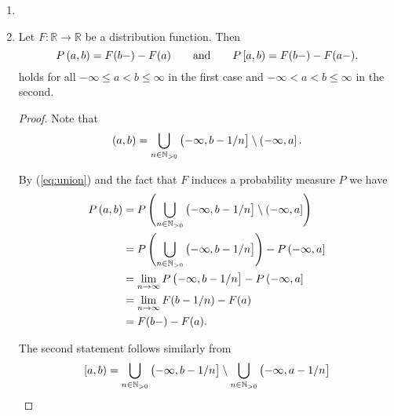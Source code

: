 \begin{enumerate}[label = \textbf{Exercise \arabic*.},wide = 0pt, itemsep=1.5ex]
\begin{proof}
		Furthermore
		\begin{equation}
			Q(A) \geq \sum_{n \in \mathbb{N}}P(A_n \cap B) + \sum_{n \in \mathbb{N}} P(A_n \cap B^c) - \varepsilon \geq Q(A \cap B) + Q(A \cap B^c) - \varepsilon
		\end{equation}

		\noindent by the additivity of $P$.

	\end{proof}
	\item 

	\item 
		\begin{lemma}
			Let $F: \mathbb{R} \to \mathbb{R}$ be a distribution function. Then
			\begin{equation}
				P\intoo{a,b} = F(b-) - F(a) \qquad \text{and} \qquad P\intco{a,b} = F(b- ) - F(a-).
			\end{equation}
			\noindent holds for all $-\infty \leq a < b \leq \infty$ in the first case and $-\infty < a < b \leq \infty$ in the second.
			\label{lem:3}
		\end{lemma}

		\begin{proof}
			Note that 
			\begin{equation}
				\intoo{a,b} = \bigcup_{n \in \mathbb{N}_{>0}} \intoc{-\infty,b - 1/n} \setminus \intoc{-\infty,a}.
				\label{eq:union}
			\end{equation}

			By (\ref{eq:union}) and the fact that $F$ induces a probability measure $P$ we have 
			\begin{align*}
				P\intoo{a,b} &= P\del[4]{\bigcup_{n \in \mathbb{N}_{>0}} \intoc{-\infty,b - 1/n} \setminus \intoc{-\infty,a}}\\
				&= P\del[4]{\bigcup_{n \in \mathbb{N}_{>0}} \intoc{-\infty,b - 1/n}} - P\intoc{-\infty,a}\\
				&= \lim_{n \to \infty} P\intoc{-\infty,b - 1/n} - P\intoc{-\infty,a}\\
				&= \lim_{n \to \infty} F(b - 1/n) - F(a)\\
				&= F(b-) - F(a).
			\end{align*}

			The second statement follows similarly from
			\begin{equation}
				\intco{a,b} = \bigcup_{n \in \mathbb{N}_{>0}} \intoc{-\infty,b - 1/n} \setminus \bigcup_{n \in \mathbb{N}_{>0}}\intoc{-\infty,a - 1/n}
			\end{equation}
		\end{proof}
		

\end{enumerate}
